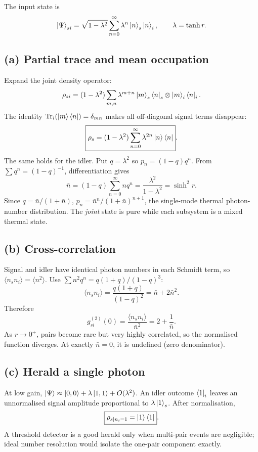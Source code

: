 
The input state is
\[
\left\lvert \Psi\right\rangle_{si}=\sqrt{1-\lambda^2}\sum_{n=0}^\infty
\lambda^n\left\lvert n\right\rangle_s\left\lvert n\right\rangle_i,\qquad \lambda=\tanh r.
\]
\subsection*{(a) Partial trace and mean occupation}
Expand the joint density operator:
\[
\rho_{si}=(1-\lambda^2)\sum_{m,n}
\lambda^{m+n}\left\lvert m\right\rangle_s\left\langle n\right\rvert_s\otimes\left\lvert m\right\rangle_i\left\langle n\right\rvert_i.
\]
The identity \(\operatorname{Tr}_i(\left\lvert m\right\rangle\left\langle n\right\rvert)=\delta_{mn}\)
makes all off-diagonal signal terms disappear:
\[
\boxed{\rho_s=(1-\lambda^2)\sum_{n=0}^\infty
\lambda^{2n}\left\lvert n\right\rangle\left\langle n\right\rvert}.
\]
The same holds for the idler.
Put \(q=\lambda^2\) so \(p_n=(1-q)q^n\).
From \(\sum q^n=(1-q)^{-1}\), differentiation gives
\[
\bar n=(1-q)\sum_{n=0}^\infty nq^n
=\boxed{\frac{\lambda^2}{1-\lambda^2}=\sinh^2r}.
\]
Since \(q=\bar n/(1+\bar n)\),
\(p_n=\bar n^n/(1+\bar n)^{n+1}\), the single-mode
thermal photon-number distribution.
The \emph{joint} state is pure while each subsystem
is a mixed thermal state.

\subsection*{(b) Cross-correlation}
Signal and idler have identical photon numbers in
each Schmidt term, so \(\langle n_sn_i\rangle=\langle n^2\rangle\).
Use
\(\sum n^2q^n=q(1+q)/(1-q)^3\):
\[
\langle n_sn_i\rangle
=\frac{q(1+q)}{(1-q)^2}
=\bar n+2\bar n^2.
\]
Therefore
\[
\boxed{g^{(2)}_{si}(0)
=\frac{\langle n_sn_i\rangle}{\bar n^2}
=2+\frac1{\bar n}}.
\]
As \(r\to0^+\), pairs become rare but very highly
correlated, so the normalised function diverges.
At exactly \(\bar n=0\), it is undefined (zero denominator).

\subsection*{(c) Herald a single photon}
At low gain,
\(\left\lvert \Psi\right\rangle\approx\left\lvert 0,0\right\rangle+\lambda\left\lvert 1,1\right\rangle
+O(\lambda^2)\).
An idler outcome \(\left\langle 1\right\rvert_i\) leaves an unnormalised
signal amplitude proportional to \(\lambda\left\lvert 1\right\rangle_s\).
After normalisation,
\[
\boxed{\rho_{s\mid n_i=1}=\left\lvert 1\right\rangle\left\langle 1\right\rvert}.
\]
A threshold detector is a good herald only when
multi-pair events are negligible; ideal number
resolution would isolate the one-pair component exactly.
